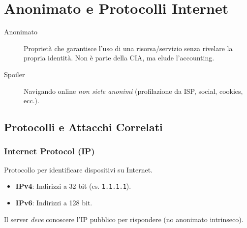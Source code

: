 \section{Anonimato e Protocolli Internet}
\begin{description}
    \item[Anonimato] Proprietà che garantisce l'uso di una risorsa/servizio senza rivelare la propria identità. Non è parte della CIA, ma elude l'accounting.
    \item[Spoiler] Navigando online \textit{non siete anonimi} (profilazione da ISP, social, cookies, ecc.).
\end{description}

\subsection{Protocolli e Attacchi Correlati}

\subsubsection{Internet Protocol (IP)}
Protocollo per identificare dispositivi su Internet.
\begin{itemize}
    \item \textbf{IPv4}: Indirizzi a 32 bit (es. \texttt{1.1.1.1}).
    \item \textbf{IPv6}: Indirizzi a 128 bit.
\end{itemize}
Il server \textit{deve} conoscere l'IP pubblico per rispondere (no anonimato intrinseco).

